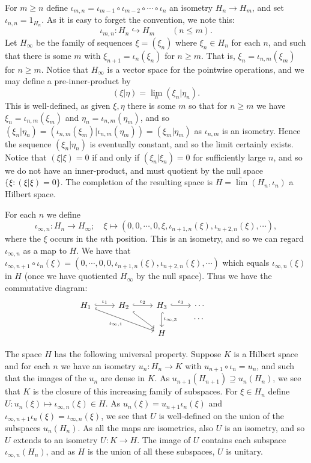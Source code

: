\documentclass[twoside,a4paper,12pt]{article}
\theoremstyle{plain}
\theoremstyle{definition}
\begin{document}
For $m\geq n$ define $\iota_{m,n} = \iota_{m-1} \circ \iota_{m-2} \circ\cdots\circ \iota_n$ an isometry $H_n \to H_m$, and set $\iota_{n,n} = 1_{H_n}$.  As it is easy to forget the convention, we note this:
\[ \iota_{m,n} \colon H_n \hookrightarrow H_m \qquad (n\leq m). \]
Let $H_\infty$ be the family of sequences $\xi=(\xi_n)$ where $\xi_n\in H_n$ for each $n$, and such that there is some $m$ with $\xi_{n+1} = \iota_n(\xi_n)$ for $n\geq m$.  That is, $\xi_n = \iota_{n,m}(\xi_m)$ for $n\geq m$.  Notice that $H_\infty$ is a vector space for the pointwise operations, and we may define a pre-inner-product by
\[ (\xi|\eta) = \lim_n (\xi_n|\eta_n). \]
This is well-defined, as given $\xi,\eta$ there is some $m$ so that for $n\geq m$ we have $\xi_n = \iota_{n,m}(\xi_m)$ and $\eta_n = \iota_{n,m}(\eta_m)$, and so $(\xi_n|\eta_n) = (\iota_{n,m}(\xi_m)|\iota_{n,m}(\eta_m)) = (\xi_m|\eta_m)$ as $\iota_{n,m}$ is an isometry.  Hence the sequence $(\xi_n|\eta_n)$ is eventually constant, and so the limit certainly exists.  Notice that $(\xi|\xi)=0$ if and only if $(\xi_n|\xi_n)=0$ for sufficiently large $n$, and so we do not have an inner-product, and must quotient by the null space $\{ \xi : (\xi|\xi)=0 \}$.  The completion of the resulting space is $H = \underrightarrow{\lim} (H_n,\iota_n)$ a Hilbert space.

For each $n$ we define
\[ \iota_{\infty, n} \colon H_n \to H_\infty; \quad \xi \mapsto (0,0,\cdots,0,\xi,\iota_{n+1,n}(\xi),\iota_{n+2,n}(\xi),\cdots), \]
where the $\xi$ occurs in the $n$th position.  This is an isometry, and so we can regard $\iota_{\infty,n}$ as a map to $H$.  We have that $\iota_{\infty,n+1} \circ \iota_n (\xi) = (0,\cdots,0,0,\iota_{n+1,n}(\xi), \iota_{n+2,n}(\xi), \cdots)$ which equals $\iota_{\infty,n}(\xi)$ in $H$ (once we have quotiented $H_\infty$ by the null space).  Thus we have the commutative diagram:
\[ \begin{tikzcd}
   H_1 \arrow[r, "\iota_1", hook] \arrow[rrd, "\iota_{\infty,1}"', hook] &
   H_2 \arrow[r, "\iota_2", hook] \arrow[rd, hook] &
   H_3 \arrow[r, "\iota_3", hook] \arrow[d, "\iota_{\infty,3}", hook] &
   \cdots & \arrow[dll, phantom, "\cdots"] \\
   && H
\end{tikzcd} \]

The space $H$ has the following universal property.  Suppose $K$ is a Hilbert space and for each $n$ we have an isometry $u_n \colon H_n \to K$ with $u_{n+1} \circ \iota_n = u_n$, and such that the images of the $u_n$ are dense in $K$.  As $u_{n+1}(H_{n+1}) \supseteq u_n(H_n)$, we see that $K$ is the closure of this increasing family of subspaces.  For $\xi\in H_n$ define $U \colon u_n(\xi) \mapsto \iota_{\infty,n}(\xi) \in H$.  As $u_n(\xi) = u_{n+1}\iota_n(\xi)$ and $\iota_{\infty,n+1}\iota_n(\xi) = \iota_{\infty,n}(\xi)$, we see that $U$ is well-defined on the union of the subspaces $u_n(H_n)$.  As all the maps are isometries, also $U$ is an isometry, and so $U$ extends to an isometry $U \colon K\to H$.  The image of $U$ contains each subspace $\iota_{\infty,n}(H_n)$, and as $H$ is the union of all these subspaces, $U$ is unitary.
\end{document}
